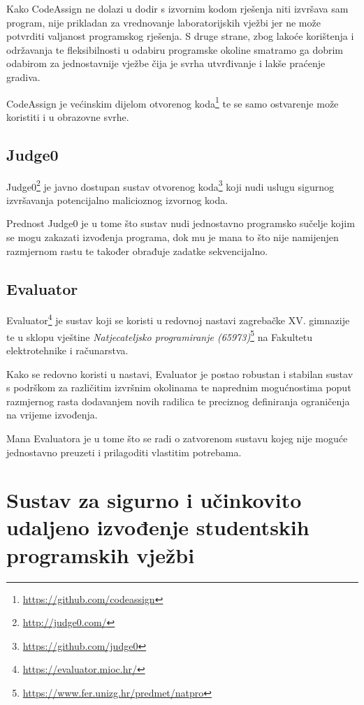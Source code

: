 \documentclass[times, utf8, zavrsni]{fer}
\begin{document}
Kako CodeAssign ne dolazi u dodir s izvornim kodom rješenja niti izvršava sam program, nije prikladan za vrednovanje laboratorijskih vježbi jer ne može potvrditi valjanost programskog rješenja. S druge strane, zbog lakoće korištenja i održavanja te fleksibilnosti u odabiru programske okoline smatramo ga dobrim odabirom za jednostavnije vježbe čija je svrha utvrđivanje i lakše praćenje gradiva.

CodeAssign je većinskim dijelom otvorenog koda{\footnote{\url{https://github.com/codeassign}}} te se samo ostvarenje može koristiti i u obrazovne svrhe.

\section{Judge0}

Judge0{\footnote{\url{http://judge0.com/}}} je javno dostupan sustav otvorenog koda{\footnote{\url{https://github.com/judge0}}} koji nudi uslugu sigurnog izvršavanja potencijalno malicioznog izvornog koda.

Prednost Judge0 je u tome što sustav nudi jednostavno programsko sučelje kojim se mogu zakazati izvođenja programa, dok mu je mana to što nije namijenjen razmjernom rastu te također obrađuje zadatke sekvencijalno. 

\section{Evaluator}

Evaluator{\footnote{\url{https://evaluator.mioc.hr/}}} je sustav koji se koristi u redovnoj nastavi zagrebačke XV. gimnazije te u sklopu vještine {\textit{Natjecateljsko programiranje (65973)}}{\footnote{\url{https://www.fer.unizg.hr/predmet/natpro}}} na Fakultetu elektrotehnike i računarstva.

Kako se redovno koristi u nastavi, Evaluator je postao robustan i stabilan sustav s podrškom za različitim izvršnim okolinama te naprednim mogućnostima poput razmjernog rasta dodavanjem novih radilica te preciznog definiranja ograničenja na vrijeme izvođenja.

Mana Evaluatora je u tome što se radi o zatvorenom sustavu kojeg nije moguće jednostavno preuzeti i prilagoditi vlastitim potrebama.

\chapter{Sustav za sigurno i učinkovito udaljeno izvođenje studentskih programskih vježbi}
\end{document}
